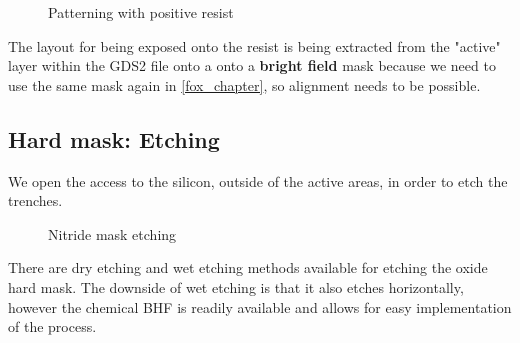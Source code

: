 \begin{figure}[H]
	\centering
	\begin{tikzpicture}[node distance = 3cm, auto, thick,scale=\CrossSectionOnly, every node/.style={transform shape}]
		
	\end{tikzpicture}
	\begin{tikzpicture}[node distance = 3cm, auto, thick,scale=\CrossSectionOnly, every node/.style={transform shape}]
		
	\end{tikzpicture}
	\caption{Patterning with positive resist}
\end{figure}

The layout for being exposed onto the resist is being extracted from the "active" layer within the GDS2 file onto a  onto a \textbf{bright field} mask because we need to use the same mask again in \autoref{fox_chapter}, so alignment needs to be possible.

\newpage

\subsection{Hard mask: Etching}\label{sti_mask_etch}

We open the access to the silicon, outside of the active areas, in order to etch the trenches.

\begin{figure}[H]
	\centering
	\begin{tikzpicture}[node distance = 3cm, auto, thick,scale=\CrossSectionOnly, every node/.style={transform shape}]
		
	\end{tikzpicture}
	\drawStepArrow{}
	\begin{tikzpicture}[node distance = 3cm, auto, thick,scale=\CrossSectionOnly, every node/.style={transform shape}]
		
	\end{tikzpicture}
	\caption{Nitride mask etching}
\end{figure}

There are dry etching and wet etching methods available for etching the oxide hard mask. The downside of wet etching is that it also etches horizontally, however the chemical BHF is readily available and allows for easy implementation of the process.\\

